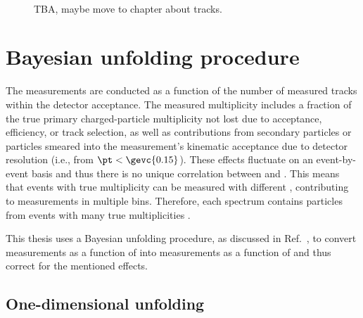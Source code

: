 \begin{figure}%
\\
\caption{TBA, maybe move to chapter about tracks.}
\label{fig:rt:tracks}
\end{figure}


\section{Bayesian unfolding procedure}

The \VOs measurements are conducted as a function of the number of measured tracks \NTm within the detector acceptance. The measured multiplicity \NTm includes a fraction of the true primary charged-particle multiplicity \NTt not lost due to acceptance, efficiency, or track selection, as well as contributions from secondary particles or particles smeared into the measurement's kinematic acceptance due to detector resolution (i.e., from $\pt < \gevc{0.15}$). These effects fluctuate on an event-by-event basis and thus there is no unique correlation between \NTm and \NTt. This means that events with true multiplicity \NTt can be measured with different \NTm, contributing to \VO measurements in multiple \NTm bins. Therefore, each spectrum contains particles from events with many true multiplicities \NTt.

This thesis uses a Bayesian unfolding procedure, as discussed in Ref.~\cite{dagostini-unfolding}, to convert \VOs measurements as a function of \NTm into measurements as a function of \NTt and thus correct for the mentioned effects.

\subsection{One-dimensional unfolding}

